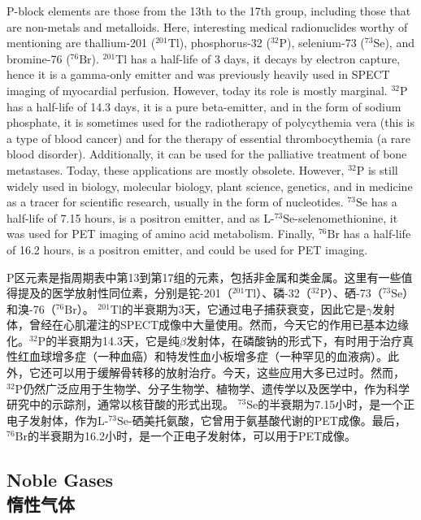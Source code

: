 \documentclass[dvipsnames, svgnames,a4paper,11pt]{article}
\begin{document}
P-block elements are those from the 13th to the 17th group, including those that are non-metals and metalloids. Here, interesting medical radionuclides worthy of mentioning are thallium-201 (\(\mathrm{^{201}Tl}\)), phosphorus-32 (\(\mathrm{^{32}P}\)), selenium-73 (\(\mathrm{^{73}Se}\)), and bromine-76 (\(\mathrm{^{76}Br}\)). \(\mathrm{^{201}Tl}\) has a half-life of 3 days, it decays by electron capture, hence it is a gamma-only emitter and was previously heavily used in SPECT imaging of myocardial perfusion. However, today its role is mostly marginal. \(\mathrm{^{32}P}\) has a half-life of 14.3 days, it is a pure beta-emitter, and in the form of sodium phosphate, it is sometimes used for the radiotherapy of polycythemia vera (this is a type of blood cancer) and for the therapy of essential thrombocythemia (a rare blood disorder). Additionally, it can be used for the palliative treatment of bone metastases. Today, these applications are mostly obsolete. However, \(\mathrm{^{32}P}\) is still widely used in biology, molecular biology, plant science, genetics, and in medicine as a tracer for scientific research, usually in the form of nucleotides. \(\mathrm{^{73}Se}\) has a half-life of 7.15 hours, is a positron emitter, and as L-\(\mathrm{^{73}Se}\)-selenomethionine, it was used for PET imaging of amino acid metabolism. Finally, \(\mathrm{^{76}Br}\) has a half-life of 16.2 hours, is a positron emitter, and could be used for PET imaging.

P区元素是指周期表中第13到第17组的元素，包括非金属和类金属。这里有一些值得提及的医学放射性同位素，分别是铊-201（\(\mathrm{^{201}Tl}\)）、磷-32（\(\mathrm{^{32}P}\)）、硒-73（\(\mathrm{^{73}Se}\)）和溴-76（\(\mathrm{^{76}Br}\)）。 \(\mathrm{^{201}Tl}\)的半衰期为3天，它通过电子捕获衰变，因此它是$\gamma$发射体，曾经在心肌灌注的SPECT成像中大量使用。然而，今天它的作用已基本边缘化。\(\mathrm{^{32}P}\)的半衰期为14.3天，它是纯$\beta$发射体，在磷酸钠的形式下，有时用于治疗真性红血球增多症（一种血癌）和特发性血小板增多症（一种罕见的血液病）。此外，它还可以用于缓解骨转移的放射治疗。今天，这些应用大多已过时。然而，\(\mathrm{^{32}P}\)仍然广泛应用于生物学、分子生物学、植物学、遗传学以及医学中，作为科学研究中的示踪剂，通常以核苷酸的形式出现。 \(\mathrm{^{73}Se}\)的半衰期为7.15小时，是一个正电子发射体，作为L-\(\mathrm{^{73}Se}\)-硒美托氨酸，它曾用于氨基酸代谢的PET成像。最后，\(\mathrm{^{76}Br}\)的半衰期为16.2小时，是一个正电子发射体，可以用于PET成像。

\subsection{Noble Gases \\惰性气体}
\end{document}
